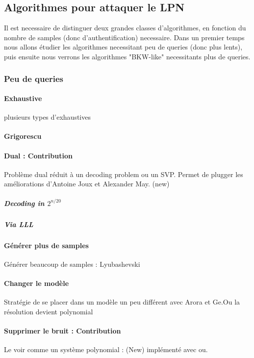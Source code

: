 \documentclass{article}		%
\begin{document}
\subsection{Algorithmes pour attaquer le LPN}
Il est necessaire de distinguer deux grandes classes
d'algorithmes, en fonction du nombre de samples (donc d'authentification)
necessaire. Dans un premier temps nous allons étudier les algorithmes
necessitant peu de queries (donc plus lents), puis ensuite nous verrons
les algorithmes "BKW-like" necessitants plus de queries.


\subsubsection{Peu de queries}
\paragraph{Exhaustive}
plusieurs types d'exhaustives
\paragraph{Grigorescu}
\paragraph{Dual : Contribution } Problème dual réduit à  un decoding
problem ou un SVP. Permet de plugger les améliorations d'Antoine Joux et Alexander May. (new)
\subparagraph{Decoding in $2^{n/20}$}
\subparagraph{Via LLL}
\paragraph{Générer plus de samples} Générer beaucoup de samples : Lyubashevski
\paragraph{Changer le modèle} Stratégie de se placer dans un modèle un peu différent avec Arora et Ge.Ou la résolution devient polynomial 
\paragraph{Supprimer le bruit : Contribution}\label{SAT}
Le voir comme un système polynomial : (New) implémenté avec ou. 
\end{document}
